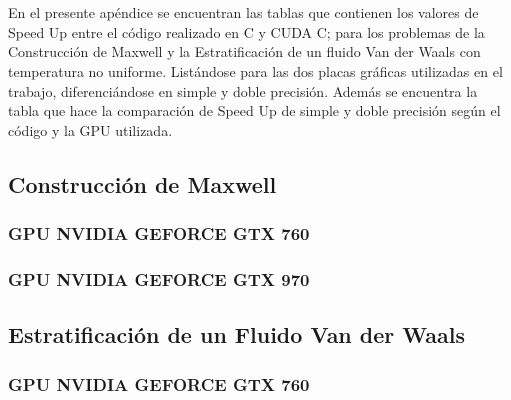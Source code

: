 \chapter{}
\label{ap1}

En el presente apéndice se encuentran las tablas que contienen 
los valores de Speed Up entre el código realizado en C y CUDA C; para los problemas de la Construcción de Maxwell y la Estratificación de un fluido Van der Waals con temperatura no uniforme.
Listándose para las dos placas gráficas utilizadas en el trabajo,
diferenciándose en simple y doble precisión.
Además se encuentra la tabla que hace la comparación de Speed Up
de simple y doble precisión según el código y la GPU utilizada.

\section{Construcción de Maxwell}

\subsection{GPU NVIDIA GEFORCE GTX 760}









\newpage

\subsection{GPU NVIDIA GEFORCE GTX 970}










\newpage

\section{Estratificación de un Fluido Van der Waals}

\subsection{GPU NVIDIA GEFORCE GTX 760}

